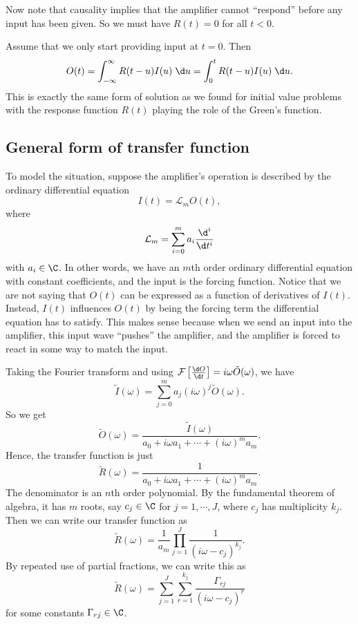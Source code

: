 \documentclass[a4paper]{article}
\begin{document}
Now note that causality implies that the amplifier cannot ``respond'' before any input has been given. So we must have $R(t) = 0$ for all $t < 0$.

Assume that we only start providing input at $t = 0$. Then
\[
  O(t) = \int_{-\infty}^\infty R(t - u) I(u)\;\d u = \int_0^t R(t - u)I(u)\;\d u.
\]
This is exactly the same form of solution as we found for initial value problems with the response function $R(t)$ playing the role of the Green's function.

\subsection{General form of transfer function}
To model the situation, suppose the amplifier's operation is described by the ordinary differential equation
\[
  I(t) = \mathcal{L}_m O(t),
\]
where
\[
  \mathcal{L}_m = \sum_{i = 0}^m a_i \frac{\d^i}{\d t^i}
\]
with $a_i \in \C$. In other words, we have an $m$th order ordinary differential equation with constant coefficients, and the input is the forcing function. Notice that we are not saying that $O(t)$ can be expressed as a function of derivatives of $I(t)$. Instead, $I(t)$ influences $O(t)$ by being the forcing term the differential equation has to satisfy. This makes sense because when we send an input into the amplifier, this input wave ``pushes'' the amplifier, and the amplifier is forced to react in some way to match the input.

Taking the Fourier transform and using $\mathcal{F}\left[\frac{\d O}{\d t}\right] = i\omega \tilde{O}(\omega)$, we have
\[
  \tilde{I}(\omega) = \sum_{j = 0}^m a_j (i\omega)^j \tilde{O}(\omega).
\]
So we get
\[
  \tilde{O}(\omega) = \frac{\tilde{I}(\omega)}{a_0 + i\omega a_1 + \cdots + (i\omega)^m a_m}.
\]
Hence, the transfer function is just
\[
  \tilde{R}(\omega) = \frac{1}{a_0 + i\omega a_1 + \cdots + (i\omega)^m a_m}.
\]
The denominator is an $n$th order polynomial. By the fundamental theorem of algebra, it has $m$ roots, say $c_j \in \C$ for $j = 1, \cdots, J$, where $c_j$ has multiplicity $k_j$. Then we can write our transfer function as
\[
  \tilde{R}(\omega) = \frac{1}{a_m} \prod_{j = 1}^J \frac{1}{(i\omega - c_j)^{k_j}}.
\]
By repeated use of partial fractions, we can write this as
\[
  \tilde{R}(\omega) = \sum_{j = 1}^J \sum_{r = 1}^{k_j} \frac{\Gamma_{rj}}{(i\omega - c_j)^r}
\]
for some constants $\Gamma_{rj} \in \C$.
\end{document}
